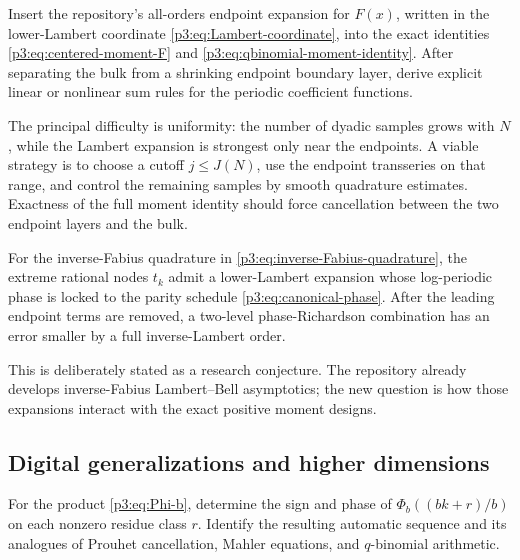\documentclass[11pt,oneside]{article}
\numberwithin{equation}{section}
\theoremstyle{definition}
\theoremstyle{remark}
\begin{document}
\begin{problem}
\label{p3:prob:Lambert-sum-rules}
Insert the repository's all-orders endpoint expansion for $F(x)$, written in the lower-Lambert coordinate \eqref{p3:eq:Lambert-coordinate}, into the exact identities \eqref{p3:eq:centered-moment-F} and \eqref{p3:eq:qbinomial-moment-identity}.  After separating the bulk from a shrinking endpoint boundary layer, derive explicit linear or nonlinear sum rules for the periodic coefficient functions.
\end{problem}

The principal difficulty is uniformity: the number of dyadic samples grows with $N$, while the Lambert expansion is strongest only near the endpoints.  A viable strategy is to choose a cutoff $j\le J(N)$, use the endpoint transseries on that range, and control the remaining samples by smooth quadrature estimates.  Exactness of the full moment identity should force cancellation between the two endpoint layers and the bulk.

\begin{conjecture}
\label{p3:conj:quantile-phase-locking}
For the inverse-Fabius quadrature in \eqref{p3:eq:inverse-Fabius-quadrature}, the extreme rational nodes $t_k$ admit a lower-Lambert expansion whose log-periodic phase is locked to the parity schedule \eqref{p3:eq:canonical-phase}.  After the leading endpoint terms are removed, a two-level phase-Richardson combination has an error smaller by a full inverse-Lambert order.
\end{conjecture}

This is deliberately stated as a research conjecture.  The repository already develops inverse-Fabius Lambert--Bell asymptotics; the new question is how those expansions interact with the exact positive moment designs.

\subsection{Digital generalizations and higher dimensions}

\begin{problem}
\label{p3:prob:base-b-signs}
For the product \eqref{p3:eq:Phi-b}, determine the sign and phase of $\Phi_b((bk+r)/b)$ on each nonzero residue class $r$.  Identify the resulting automatic sequence and its analogues of Prouhet cancellation, Mahler equations, and $q$-binomial arithmetic.
\end{problem}
\end{document}
